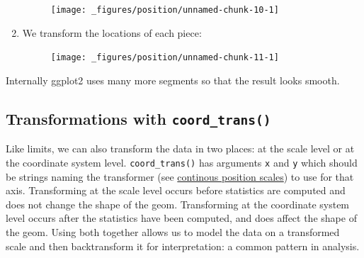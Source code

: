 \begin{enumerate}
  \begin{figure}[H]
    \centering
    \texttt{[image: \_figures/position/unnamed-chunk-10-1]}
  \end{figure}
\item
  We transform the locations of each piece:

\begin{Shaded}
\begin{Highlighting}[]
\StringTok{ }
   \StringTok{ }
   \StringTok{ }
\NormalTok{)}

\StringTok{ }
\StringTok{  }\NormalTok{() +}\StringTok{ }
\StringTok{  }\NormalTok{(} \NormalTok{, } \NormalTok{) +}\StringTok{ }
\StringTok{  }\NormalTok{()}
\end{Highlighting}
\end{Shaded}

  \begin{figure}[H]
    \centering
    \texttt{[image: \_figures/position/unnamed-chunk-11-1]}
  \end{figure}
\end{enumerate}

Internally ggplot2 uses many more segments so that the result looks
smooth.

\subsection{\texorpdfstring{Transformations with
\texttt{coord\_trans()}}{Transformations with coord\_trans()}}

Like limits, we can also transform the data in two places: at the scale
level or at the coordinate system level. \texttt{coord\_trans()} has
arguments \texttt{x} and \texttt{y} which should be strings naming the
transformer (see \hyperref[sub:scale-position]{continous position
scales}) to use for that axis. Transforming at the scale level occurs
before statistics are computed and does not change the shape of the
geom. Transforming at the coordinate system level occurs after the
statistics have been computed, and does affect the shape of the geom.
Using both together allows us to model the data on a transformed scale
and then backtransform it for interpretation: a common pattern in
analysis. 
 

